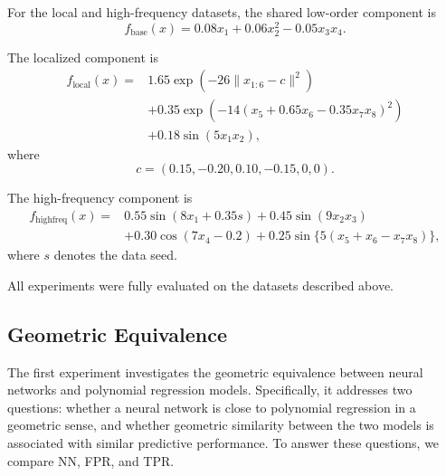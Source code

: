 \documentclass[]{interact}
\theoremstyle{plain}
\theoremstyle{definition}
\theoremstyle{remark}
\begin{document}
For the local and high-frequency datasets, the shared low-order component is
\[
f_{\mathrm{base}}(x)
=
0.08x_1+0.06x_2^2-0.05x_3x_4.
\]

The localized component is
\[
\begin{aligned}
f_{\mathrm{local}}(x)
={}&
1.65\exp\!\left(-26\|x_{1:6}-c\|^2\right) \\
&+
0.35\exp\!\left(-14(x_5+0.65x_6-0.35x_7x_8)^2\right) \\
&+
0.18\sin(5x_1x_2),
\end{aligned}
\]
where
\[
c=(0.15,-0.20,0.10,-0.15,0,0).
\]

The high-frequency component is
\[
\begin{aligned}
f_{\mathrm{highfreq}}(x)
={}&
0.55\sin(8x_1+0.35s)
+
0.45\sin(9x_2x_3) \\
&+
0.30\cos(7x_4-0.2)
+
0.25\sin\{5(x_5+x_6-x_7x_8)\},
\end{aligned}
\]
where \(s\) denotes the data seed.


All experiments were fully evaluated on the datasets described above.




\subsection{Geometric Equivalence}
The first experiment investigates the geometric equivalence between neural networks and polynomial regression models. Specifically, it addresses two questions: whether a neural network is close to polynomial regression in a geometric sense, and whether geometric similarity between the two models is associated with similar predictive performance. To answer these questions, we compare NN, FPR, and TPR.
\end{document}
